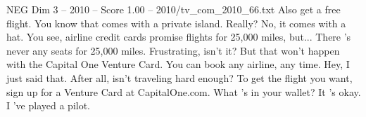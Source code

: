 \begin{textsample}{NEG Dim 3 – 2010 – Score 1.00 – 2010/tv\_com\_2010\_66.txt}  \label{ex:f3_neg_059}
Also get a free flight.
You know that comes with a private island.
Really?
No, it comes with a hat.
You see, airline credit cards promise flights for 25,000 miles, but...
There 's never any seats for 25,000 miles.
Frustrating, isn't it?
But that won't happen with the Capital One Venture Card.
You can book any airline, any time.
Hey, I just said that.
After all, isn't traveling hard enough?
To get the flight you want, sign up for a Venture Card at CapitalOne.com.
What 's in your wallet?
It 's okay.
I 've played a pilot.

\end{textsample}
